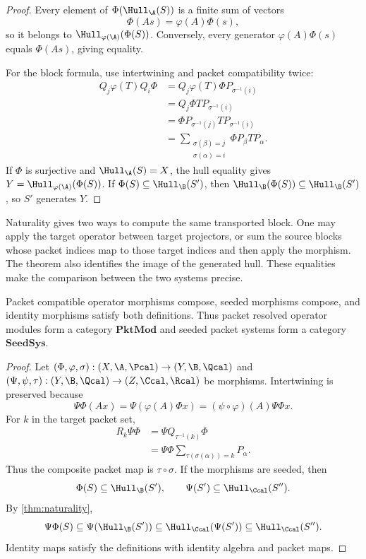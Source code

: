 \begin{proof}
Every element of $\Phi(\Hull_{\A}(S))$ is a finite sum of vectors
\[
\Phi(As)=\varphi(A)\Phi(s),
\]
so it belongs to $\Hull_{\varphi(\A)}(\Phi(S))$.  Conversely, every generator $\varphi(A)\Phi(s)$ equals $\Phi(As)$, giving equality.

For the block formula, use intertwining and packet compatibility twice:
\begin{align*}
Q_j\varphi(T)Q_i\Phi
&=Q_j\varphi(T)\Phi P_{\sigma^{-1}(i)}\\
&=Q_j\Phi TP_{\sigma^{-1}(i)}\\
&=\Phi P_{\sigma^{-1}(j)}TP_{\sigma^{-1}(i)}\\
&=\sum_{\substack{\sigma(\beta)=j\\\sigma(\alpha)=i}}
\Phi P_\beta TP_\alpha.
\end{align*}
If $\Phi$ is surjective and $\Hull_{\A}(S)=X$, the hull equality gives $Y=\Hull_{\varphi(\A)}(\Phi(S))$.  If $\Phi(S)\subseteq\Hull_{\B}(S')$, then $\Hull_{\B}(\Phi(S))\subseteq\Hull_{\B}(S')$, so $S'$ generates $Y$.
\end{proof}

\begin{keyidea}
Naturality gives two ways to compute the same transported block.  One may apply the target operator between target projectors, or sum the source blocks whose packet indices map to those target indices and then apply the morphism.  The theorem also identifies the image of the generated hull.  These equalities make the comparison between the two systems precise.
\end{keyidea}


\begin{proposition}
\label{prop:seed-category}
Packet compatible operator morphisms compose, seeded morphisms compose, and identity morphisms satisfy both definitions.  Thus packet resolved operator modules form a category $\mathbf{PktMod}$ and seeded packet systems form a category $\mathbf{SeedSys}$.
\end{proposition}

\begin{proof}
Let $(\Phi,\varphi,\sigma):(X,\A,\Pcal)\to(Y,\B,\Qcal)$ and $(\Psi,\psi,\tau):(Y,\B,\Qcal)\to(Z,\Ccal,\Rcal)$ be morphisms.  Intertwining is preserved because
\[
\Psi\Phi(Ax)
=
\Psi(\varphi(A)\Phi x)
=
(\psi\circ\varphi)(A)\Psi\Phi x.
\]
For $k$ in the target packet set,
\begin{align*}
R_k\Psi\Phi
&=\Psi Q_{\tau^{-1}(k)}\Phi\\
&=\Psi\Phi
\sum_{\tau(\sigma(\alpha))=k}P_\alpha.
\end{align*}
Thus the composite packet map is $\tau\circ\sigma$.  If the morphisms are seeded, then
\[
\Phi(S)\subseteq\Hull_{\B}(S'),
\qquad
\Psi(S')\subseteq\Hull_{\Ccal}(S'').
\]
By \cref{thm:naturality},
\[
\Psi\Phi(S)
\subseteq
\Psi(\Hull_{\B}(S'))
\subseteq
\Hull_{\Ccal}(\Psi(S'))
\subseteq
\Hull_{\Ccal}(S'').
\]
Identity maps satisfy the definitions with identity algebra and packet maps.
\end{proof}

